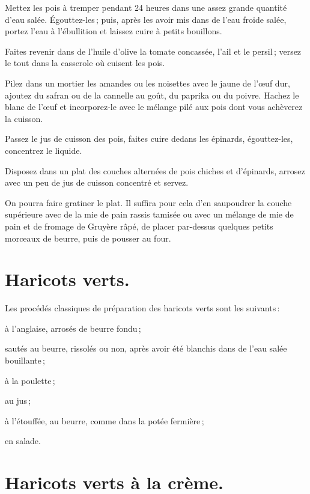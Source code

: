 Mettez les pois à tremper pendant 24 heures dans une assez grande quantité
d'eau salée. Égouttez-les ; puis, après les avoir mis dans de l'eau froide
salée, portez l'eau à l'ébullition et laissez cuire à petits bouillons.

Faites revenir dans de l'huile d'olive la tomate concassée, l'ail et le
persil ; versez le tout dans la casserole où cuisent les pois.

Pilez dans un mortier les amandes ou les noisettes avec le jaune de l'œuf dur,
ajoutez du safran ou de la cannelle au goût, du paprika ou du poivre. Hachez le
blanc de l'œuf et incorporez-le avec le mélange pilé aux pois dont vous
achèverez la cuisson.

Passez le jus de cuisson des pois, faites cuire dedans les épinards,
égouttez-les, concentrez le liquide.

Disposez dans un plat des couches alternées de pois chiches et d'épinards,
arrosez avec un peu de jus de cuisson concentré et servez.

\sk

On pourra faire gratiner le plat. Il suffira pour cela d'en saupoudrer la
couche supérieure avec de la mie de pain rassis tamisée ou avec un mélange de
mie de pain et de fromage de Gruyère râpé, de placer par-dessus quelques petits
morceaux de beurre, puis de pousser au four.

\section*{\centering Haricots verts.}
{}

Les procédés classiques de préparation des haricots verts sont les suivants :

à l'anglaise, arrosés de beurre fondu ;

sautés au beurre, rissolés ou non, après avoir été blanchis dans de l’eau salée
bouillante ;

à la poulette ;

au jus ;

à l'étouffée, au beurre, comme dans la potée fermière ;

en salade.

\section*{\centering Haricots verts à la crème.}
{}

